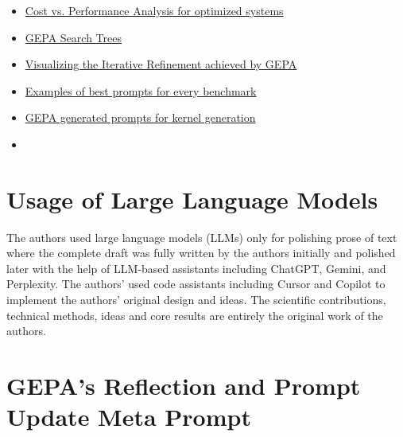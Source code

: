 \documentclass{article} %
\begin{document}
\begin{itemize}
    \item \hyperref[appendix:cost_perf_analysis]{Cost vs. Performance Analysis for optimized systems}
    \item \hyperref[appendix:gepa_search_trees]{GEPA Search Trees}
    \item \hyperref[appendix:visualizing_iter_ref]{Visualizing the Iterative Refinement achieved by GEPA}
    \item \hyperref[appendix:all_prompts]{Examples of best prompts for every benchmark}
    \item \hyperref[appendix:inf_time_search_prompts]{GEPA generated prompts for kernel generation}
    \item {}
\end{itemize}

\section{Usage of Large Language Models}\label{appendix:LLM_usage}
The authors used large language models (LLMs) only for polishing prose of text where the complete draft was fully written by the authors initially and polished later with the help of LLM-based assistants including ChatGPT, Gemini, and Perplexity. The authors' used code assistants including Cursor and Copilot to implement the authors’ original design and ideas. The scientific contributions, technical methods, ideas and core results are entirely the original work of the authors.

\section{GEPA's Reflection and Prompt Update Meta Prompt}\label{appendix:gepa_meta_prompt}
\end{document}
